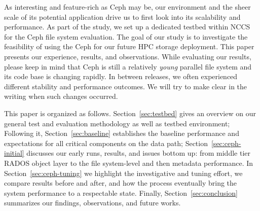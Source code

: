 As interesting and feature-rich as Ceph may be, our environment and the sheer
scale of its potential application drive us to first look into its scalability
and performance.  As part of the study, we set up a dedicated testbed within
NCCS for the Ceph file system evaluation. The goal of our study is to
investigate the feasibility of using the Ceph for our future HPC storage
deployment. This paper presents our experience, results, and observations.
While evaluating our results, please keep in mind that Ceph is still a
relatively \textit{young} parallel file system and its code base is changing
rapidly. In between releases, we often experienced different stability and
performance outcomes.  We will try to make clear in the writing when such
changes occurred.

This paper is organized as follows. Section~\ref{sec:testbed} gives an
overview on our general test and evaluation methodology as well as testbed
environment; Following it, Section~\ref{sec:baseline} establishes the baseline
performance and expectations for all critical components on the data path;
Section~\ref{sec:ceph-initial} discusses our early runs, results, and issues
bottom up: from middle tier RADOS object layer to the file system-level and
then metadata performance. In Section~\ref{sec:ceph-tuning} we highlight the
investigative and tuning effort, we compare results before and after, and how
the process eventually bring the system performance to a respectable state.
Finally, Section~\ref{sec:conclusion} summarizes our findings, observations,
and future works.
